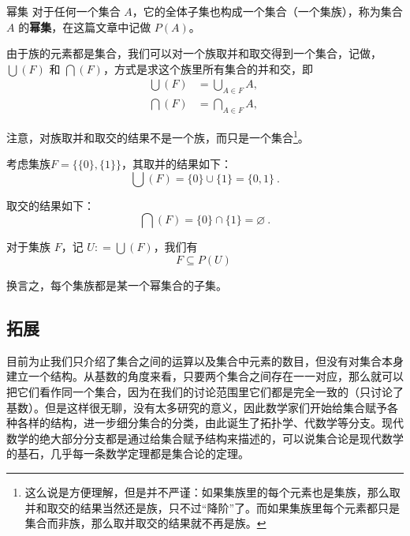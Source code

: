 \begin{definition}{幂集}
对于任何一个集合 $A$，它的全体子集也构成一个集合（一个集族），称为集合 $A$ 的\textbf{幂集}，在这篇文章中记做 $P(A)$。
\end{definition}

由于族的元素都是集合，我们可以对一个族取并和取交得到一个集合，记做，$\bigcup(F)$ 和 $\bigcap(F)$，方式是求这个族里所有集合的并和交，即
$$
\begin{aligned}
\bigcup(F) &= \bigcup_{A \in F} A, \\
\bigcap(F) &= \bigcap_{A \in F} A,
\end{aligned}~
$$

注意，对族取并和取交的结果不是一个族，而只是一个集合\footnote{这么说是方便理解，但是并不严谨：如果集族里的每个元素也是集族，那么取并和取交的结果当然还是族，只不过“降阶”了。而如果集族里每个元素都只是集合而非族，那么取并取交的结果就不再是族。}。

\begin{example}{}
考虑集族$F=\{\{0\}, \{1\}\}$，其取并的结果如下：
\begin{equation}
\bigcup(F)=\{0\}\cup\{1\}=\{0, 1\}~.
\end{equation}

取交的结果如下：
\begin{equation}
\bigcap(F)=\{0\}\cap\{1\}=\varnothing~.
\end{equation}
\end{example}

\begin{theorem}{}
对于集族 $F$，记 $U: = \bigcup(F)$，我们有
$$
F \subseteq P(U)~
$$
\end{theorem}

换言之，每个集族都是某一个幂集合的子集。

\subsection{拓展}
目前为止我们只介绍了集合之间的运算以及集合中元素的数目，但没有对集合本身建立一个结构。从基数的角度来看，只要两个集合之间存在一一对应，那么就可以把它们看作同一个集合，因为在我们的讨论范围里它们都是完全一致的（只讨论了基数）。但是这样很无聊，没有太多研究的意义，因此数学家们开始给集合赋予各种各样的结构，进一步细分集合的分类，由此诞生了拓扑学、代数学等分支。现代数学的绝大部分分支都是通过给集合赋予结构来描述的，可以说集合论是现代数学的基石，几乎每一条数学定理都是集合论的定理。

